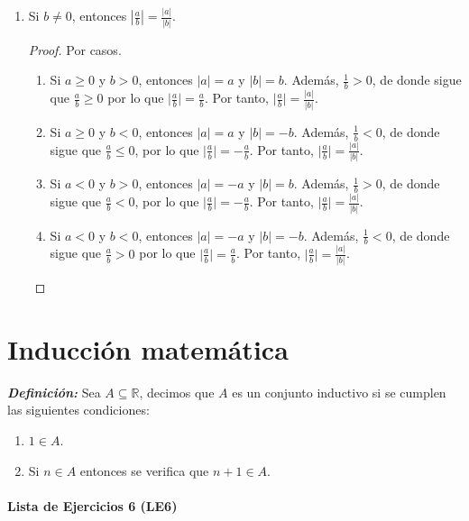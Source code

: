 \documentclass[11pt]{article}
\newcommand{\R}{\mathbb{R}}
\newcommand{\bfit}[1]{\textbf{\textit{#1}}}
\let\subset\subseteq
\begin{document}
\begin{enumerate}[label=\alph*)]
\item Si $b\neq 0$, entonces $\left| \frac{a}{b} \right| = \frac{|a|}{|b|}$.

\vspace{-1em}\begin{proof} Por casos.
    \begin{enumerate}[label=\roman*)]
        \item Si $a \geq 0$ y $b>0$, entonces $|a|=a$ y $|b|=b$. Además, $\frac{1}{b} >0$, de donde sigue que $\frac{a}{b} \geq 0$ por lo que $\big| \frac{a}{b} \big| = \frac{a}{b}$. Por tanto, $ \big| \frac{a}{b} \big| = \frac{|a|}{|b|}$.
        \item Si $a \geq 0$ y $b<0$, entonces $|a|=a$ y $|b|=-b$. Además, $\frac{1}{b} <0$, de donde sigue que $\frac{a}{b} \leq 0$, por lo que $\big| \frac{a}{b} \big| =- \frac{a}{b}$. Por tanto, $ \big| \frac{a}{b} \big| = \frac{|a|}{|b|}$.
        \item Si $a<0$ y $b>0$, entonces $|a|=-a$ y $|b|=b$. Además, $\frac{1}{b} >0$, de donde sigue que $\frac{a}{b} < 0$, por lo que $\big| \frac{a}{b} \big| =- \frac{a}{b}$. Por tanto, $ \big| \frac{a}{b} \big| = \frac{|a|}{|b|}$.
        \item Si $a<0$ y $b<0$, entonces $|a|=-a$ y $|b|=-b$. Además, $\frac{1}{b} <0$, de donde sigue que $\frac{a}{b} > 0$ por lo que $\big| \frac{a}{b} \big| = \frac{a}{b}$. Por tanto, $ \big| \frac{a}{b} \big| = \frac{|a|}{|b|}$. \qedhere
    \end{enumerate}    
\end{proof} \vspace{-1em}

\end{enumerate}

\pagebreak

\part*{Inducción matemática}

\bfit{Definición:}  Sea $A\subset \R$, decimos que $A$ es un conjunto inductivo si se cumplen las siguientes condiciones:
    \begin{enumerate}[label=\roman*)]
        \item $1 \in A$.
        \item Si $n \in A$ entonces se verifica que $n+1 \in A$.
    \end{enumerate}

\subsection*{Lista de Ejercicios 6 (LE6)}
\end{document}
